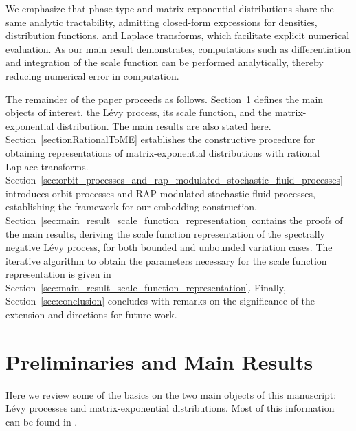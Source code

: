 \documentclass[a4paper,11pt]{article}
\numberwithin{equation}{section}
\theoremstyle{plain}
\theoremstyle{definition}
\newcommand{\1}{\mathbf{1}}
\begin{document}
We emphasize that phase-type and matrix-exponential distributions share the same analytic tractability, admitting closed-form expressions for densities, distribution functions, and Laplace transforms, which facilitate explicit numerical evaluation. As our main result demonstrates, computations such as differentiation and integration of the scale function can be performed analytically, thereby reducing numerical error in computation.

The remainder of the paper proceeds as follows. 
Section~\ref{sec:matrix_exponential_distributions} defines the main objects of interest, the L\'evy process, its scale function, and the matrix-exponential distribution. 
The main results are also stated here.
Section~\ref{sectionRationalToME} establishes the constructive procedure for obtaining representations of matrix-exponential distributions with rational Laplace transforms. Section~\ref{sec:orbit_processes_and_rap_modulated_stochastic_fluid_processes} introduces orbit processes and RAP-modulated stochastic fluid processes, establishing the framework for our embedding construction. Section~\ref{sec:main_result_scale_function_representation} contains the proofs of the main results, deriving the scale function representation of the spectrally negative L\'evy process, for both bounded and unbounded variation cases.
The iterative algorithm to obtain the parameters necessary for the scale function representation is given in Section~\ref{sec:main_result_scale_function_representation}.
Finally, Section~\ref{sec:conclusion} concludes with remarks on the significance of the extension and directions for future work.

\section{Preliminaries and Main Results}\label{sec:matrix_exponential_distributions}
Here we review some of the basics on the two main objects of this manuscript: Lévy processes and matrix-exponential distributions. Most of this information can be found in \cite{Kyprianou2014,BladtNielsen2017}.
\end{document}
